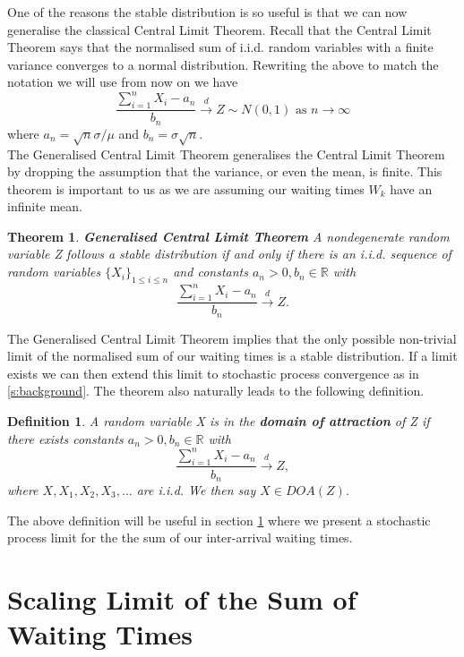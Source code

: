 \documentclass[honours,12pt]{unswthesis}
\newcommand{\R}{\mathbb{R}}
\newcommand{\1}{\mathbf 1}
\newtheorem{theorem}[equation]{Theorem}
\newtheorem{definition}[equation]{Definition}
\numberwithin{equation}{section}
\theoremstyle{definition}
\theoremstyle{remark}
\begin{document}
One of the reasons the stable distribution is so useful is that we can now generalise the classical Central Limit Theorem. Recall that the Central Limit Theorem says that the normalised sum of i.i.d. random variables with a finite variance converges to a normal distribution. Rewriting the above to match the notation we will use from now on we have
\[
	\frac{\sum^n_{i=1}X_i-a_n}{b_n} \overset{d}{\to}Z \sim N(0,1) \textrm{ as $n\to\infty$}
\]
where $a_n=\sqrt{n}\sigma/\mu$ and $b_n=\sigma\sqrt{n}.$\\

\noindent The Generalised Central Limit Theorem generalises the Central Limit Theorem by dropping the assumption that the variance, or even the mean, is finite. This theorem is important to us as we are assuming our waiting times $W_k$ have an infinite mean.\\

\begin{theorem}\cite{Nolan2015}\label{th:gclt}
\textbf{Generalised Central Limit Theorem} A nondegenerate random variable Z follows a stable distribution if and only if there is an i.i.d. sequence of random variables $\{X_i\}_{1\leq i \leq n}$  and constants $a_n>0, b_n \in \R$ with 
\[
	\frac{\sum^n_{i=1}X_i-a_n}{b_n} \overset{d}{\longrightarrow}Z.
\]
\end{theorem}

\noindent The Generalised Central Limit Theorem implies that the only possible non-trivial limit of the normalised sum of our waiting times is a stable distribution. If a limit exists we can then extend this limit to stochastic process convergence as in \ref{s:background}. The theorem also naturally leads to the following definition.\\

\begin{definition}\cite{Nolan2015}\label{def:DOA}
	A random variable X is in the \textbf{domain of attraction} of Z if there exists constants $a_n>0,b_n\in\R$ with
	\[
		\frac{\sum^n_{i=1}X_i-a_n}{b_n} \overset{d}{\longrightarrow}Z,
	\]
	where $X, X_1, X_2, X_3, \ldots$ are i.i.d. We then say $X\in DOA(Z)$.\\
\end{definition}

\noindent The above definition will be useful in section \ref{s:waitingTimes} where we present a stochastic process limit for the the sum of our inter-arrival waiting times.\\

\section{Scaling Limit of the Sum of Waiting Times}\label{s:waitingTimes}
\end{document}

